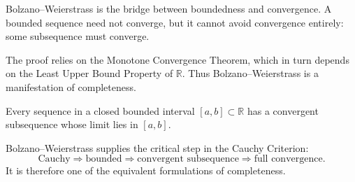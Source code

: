 \begin{remark}
Bolzano--Weierstrass is the bridge between boundedness
and convergence.  
A bounded sequence need not converge, but it cannot
avoid convergence entirely: some subsequence must
converge.
\end{remark}

\begin{remark}
The proof relies on the Monotone Convergence Theorem,
which in turn depends on the Least Upper Bound Property
of $\mathbb{R}$.  
Thus Bolzano--Weierstrass is a manifestation of
completeness.
\end{remark}

\begin{corollary}
Every sequence in a closed bounded interval
$[a,b]\subset\mathbb{R}$ has a convergent subsequence
whose limit lies in $[a,b]$.
\end{corollary}



\begin{remark}
Bolzano--Weierstrass supplies the critical step in the
Cauchy Criterion:
\[
\text{Cauchy}
\Rightarrow
\text{bounded}
\Rightarrow
\text{convergent subsequence}
\Rightarrow
\text{full convergence}.
\]
It is therefore one of the equivalent formulations of
completeness.
\end{remark}





